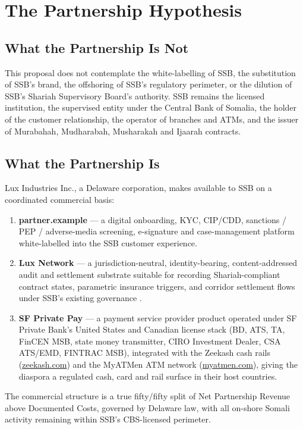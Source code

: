 \documentclass[11pt,letterpaper]{article}
\begin{document}
\section{The Partnership Hypothesis}

\subsection{What the Partnership Is Not}
This proposal does not contemplate the white-labelling of SSB, the
substitution of SSB's brand, the offshoring of SSB's regulatory
perimeter, or the dilution of SSB's Shariah Supervisory Board's
authority. SSB remains the licensed institution, the supervised entity
under the Central Bank of Somalia, the holder of the customer
relationship, the operator of branches and ATMs, and the issuer of
Murabahah, Mudharabah, Musharakah and Ijaarah contracts.

\subsection{What the Partnership Is}
Lux Industries Inc., a Delaware corporation, makes available to SSB on
a coordinated commercial basis:
\begin{enumerate}[leftmargin=1.6em]
  \item \textbf{partner.example} --- a digital onboarding, KYC, CIP/CDD,
        sanctions / PEP / adverse-media screening, e-signature and
        case-management platform white-labelled into the SSB customer
        experience.
  \item \textbf{Lux Network} --- a jurisdiction-neutral,
        identity-bearing, content-addressed audit and settlement
        substrate suitable for recording Shariah-compliant contract
        states, parametric insurance triggers, and corridor settlement
        flows under SSB's existing governance
        \cite{lux_adoption_roadmap}.
  \item \textbf{SF Private Pay} --- a payment service provider product
        operated under SF Private Bank's United States and Canadian
        license stack (BD, ATS, TA, FinCEN MSB, state money
        transmitter, CIRO Investment Dealer, CSA ATS/EMD, FINTRAC MSB),
        integrated with the Zeekash cash rails
        (\href{https://zeekash.com}{zeekash.com}) and the MyATMen ATM
        network (\href{https://myatmen.com}{myatmen.com}), giving the
        diaspora a regulated cash, card and rail surface in their host
        countries.
\end{enumerate}
The commercial structure is a true fifty/fifty split of Net Partnership
Revenue above Documented Costs, governed by Delaware law, with all
on-shore Somali activity remaining within SSB's CBS-licensed perimeter.
\end{document}
